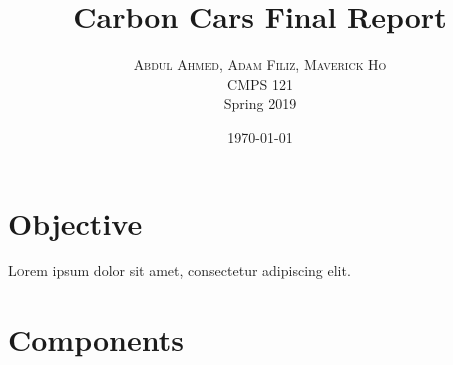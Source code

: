\documentclass[twoside,twocolumn]{article}
\title{Carbon Cars Final Report} %
\author{%
\textsc{Abdul Ahmed, Adam Filiz, Maverick Ho}\\[1ex] %
\normalsize CMPS 121 \\ %
\normalsize  Spring 2019
}
\date{\today} %
\begin{document}
\maketitle


\section{Objective}

\lettrine[nindent=0em,lines=3]{L} orem ipsum dolor sit amet, consectetur adipiscing elit.
\blindtext %

\blindtext %


\section{Components}
\end{document}
